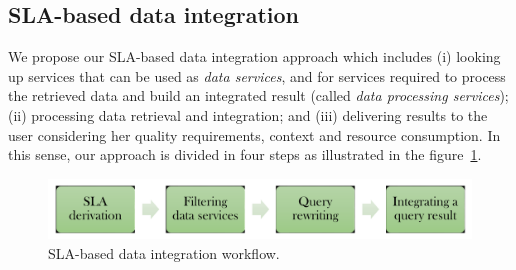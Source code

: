 \subsection{SLA-based data integration}
We propose our SLA-based data integration approach which includes (i) looking up services that can be used as \textit{data services}, and for services required to process the retrieved data and build an integrated result (called \textit{data processing services}); (ii) processing data retrieval and integration; and (iii) delivering results to the user considering her quality requirements, context and resource consumption.  In this sense, our approach is divided in four steps as illustrated in the figure~\ref{fig:generalapproach}. 
\begin{figure}[h!]
\centering
\includegraphics[scale=0.4]{workflow-approach.pdf}
\caption{SLA-based data integration workflow.}
\label{fig:generalapproach}
\end{figure}

